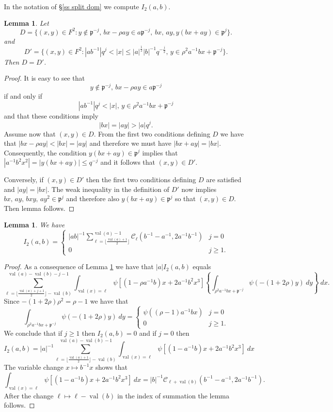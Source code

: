 \documentclass[12pt]{amsart}
\newcommand{\abs}[1]{\left|{#1}\right|}
\newcommand{\p}{\mathfrak{p}}
\newcommand{\val}{{\operatorname{val}}}
\newcommand{\Cu}{\mathcal{C}}
\newtheorem{lemma}[theorem]{Lemma}
\theoremstyle{remark}
\begin{document}
\subsubsection{} In the notation of \S\ref{ss split dom} we compute $I_2(a,b)$.


\begin{lemma}\label{lem dom D}
Let
\[
D=\{(x,y)\in F^2:y\not\in \p^{-j},\,bx-\rho ay\in a\p^{-j},\ bx,\,ay, y(bx+ay) \in \p^j\}.
\]
and
\[
D'=\{(x,y)\in F^2:\abs{ab^{-1}}q^j<\abs{x}\le \abs{a}^{\frac12}\abs{b}^{-1}q^{-\frac{j}2},\,y\in \rho^2 a^{-1}bx+\p^{-j}\}.
\]
Then $D=D'$.
\end{lemma}
\begin{proof}
It is easy to see that 
\[
y\not\in \p^{-j},\,bx-\rho ay\in a\p^{-j}
\]
if and only if
\[
\abs{ab^{-1}}q^j<\abs{x},\,y\in \rho^2 a^{-1}bx+\p^{-j}
\]
and that these conditions imply 
\[
\abs{bx}=\abs{ay}>\abs{a}q^j.
\]
Assume now that $(x,y)\in D$. 
From the first two conditions defining $D$ we have that $\abs{bx-\rho ay}<\abs{bx}=\abs{ay}$ and therefore we must have $\abs{bx+ay}=\abs{bx}$. Consequently, the condition $y(bx+ay) \in \p^j$ implies that $\abs{a^{-1}b^2x^2}=\abs{y(bx+ay)}\le q^{-j}$ and it follows that $(x,y)\in D'$. 

Conversely, if $(x,y)\in D'$
then the first two conditions defining $D$ are satisfied and $\abs{ay}=\abs{bx}$. The weak inequality in the definition of $D'$ now implies $bx,\,ay,\,bxy,\,ay^2\in \p^j$ and therefore also $y(bx+ay) \in \p^j$ so that $(x,y)\in D$. Then lemma follows. 
\end{proof}
\begin{lemma}\label{lem I2}
We have
\[
I_2(a,b)=\begin{cases}
\abs{ab}^{-1}\sum_{\ell=\lfloor\frac{\val(a)+1}2\rfloor}^{\val(a)-1}\Cu_\ell(b^{-1}-a^{-1},2a^{-1}b^{-1}) & j=0 \\ 
0 & j\ge 1.
\end{cases}
\]
\end{lemma}
\begin{proof}
As a consequence of Lemma \ref{lem dom D} we have that $\abs{a}I_2(a,b)$ equals
\[
\sum_{\ell=\lfloor\frac{\val(a)+j+1}2 \rfloor-\val(b)}^{\val(a)-\val(b)-j-1} \int_{\val(x)=\ell} \psi[(1-\rho a^{-1}b)x+2a^{-1}b^2x^3]\left\{\int_{\rho^2 a^{-1}bx+\p^{-j}} \psi(-(1+2\rho)y)\ dy\right\}  \ dx.
\]
Since $-(1+2\rho)\rho^2=\rho-1$ we have that
\[
\int_{\rho^2 a^{-1}bx+\p^{-j}} \psi(-(1+2\rho)y)\ dy=\begin{cases}
\psi((\rho-1)a^{-1}bx) & j=0 \\
0 & j\ge 1.
\end{cases}
\]
We conclude that if $j\ge 1$ then $I_2(a,b)=0$ and if $j=0$ then 
\[
I_2(a,b)=\abs{a}^{-1}\sum_{\ell=\lfloor\frac{\val(a)+1}2 \rfloor-\val(b)}^{\val(a)-\val(b)-1} \int_{\val(x)=\ell} \psi[(1- a^{-1}b)x+2a^{-1}b^2x^3]\ dx
\]
The variable change $x\mapsto b^{-1}x$ shows that
\[
\int_{\val(x)=\ell} \psi[(1- a^{-1}b)x+2a^{-1}b^2x^3]\ dx=\abs{b}^{-1}\Cu_{\ell+\val(b)}(b^{-1}-a^{-1},2a^{-1}b^{-1}).
\]
After the change $\ell\mapsto \ell-\val(b)$ in the index of summation the lemma follows. 
\end{proof}
\end{document}
